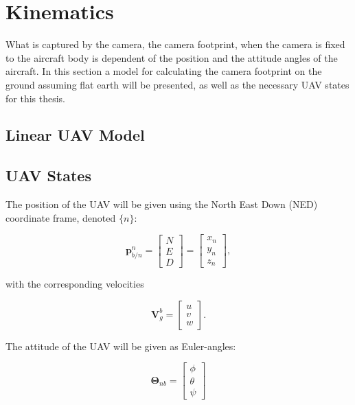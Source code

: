 \chapter{Kinematics}
\label{ch:kinematics}

What is captured by the camera, the camera footprint, when the camera is fixed to the aircraft body is dependent of the position and the attitude angles of the aircraft. In this section a model for calculating the camera footprint on the ground assuming flat earth will be presented, as well as the necessary UAV states for this thesis.


\section{Linear UAV Model}


\section{UAV States}

The position of the UAV will be given using the North East Down (NED) coordinate frame, denoted $\{n\}$:

\begin{equation}
	\mathbf{p}_{b/n}^n =
	\begin{bmatrix}
		N \\ E \\ D
	\end{bmatrix}
	=
	\begin{bmatrix}
		x_n \\ y_n \\ z_n
	\end{bmatrix},
\end{equation}

with the corresponding velocities

\begin{equation}
	\mathbf{V}^b_g =
	\begin{bmatrix}
		u \\ v \\ w
	\end{bmatrix}.
\end{equation}

The attitude of the UAV will be given as Euler-angles:

\begin{equation}
	\bm{\Theta}_{nb} =
	\begin{bmatrix}
		\phi \\ \theta \\ \psi
	\end{bmatrix}	
\end{equation}

